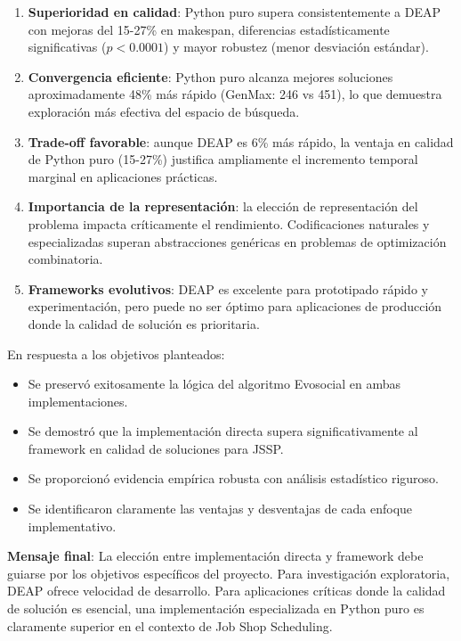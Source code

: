 \documentclass[12pt,a4paper]{article}
\begin{document}
\begin{enumerate}
    \item \textbf{Superioridad en calidad}: Python puro supera consistentemente a DEAP con mejoras del 15-27\% en makespan, diferencias estadísticamente significativas ($p < 0.0001$) y mayor robustez (menor desviación estándar).
    
    \item \textbf{Convergencia eficiente}: Python puro alcanza mejores soluciones aproximadamente 48\% más rápido (GenMax: 246 vs 451), lo que demuestra exploración más efectiva del espacio de búsqueda.
    
    \item \textbf{Trade-off favorable}: aunque DEAP es 6\% más rápido, la ventaja en calidad de Python puro (15-27\%) justifica ampliamente el incremento temporal marginal en aplicaciones prácticas.
    
    \item \textbf{Importancia de la representación}: la elección de representación del problema impacta críticamente el rendimiento. Codificaciones naturales y especializadas superan abstracciones genéricas en problemas de optimización combinatoria.
    
    \item \textbf{Frameworks evolutivos}: DEAP es excelente para prototipado rápido y experimentación, pero puede no ser óptimo para aplicaciones de producción donde la calidad de solución es prioritaria.
\end{enumerate}

En respuesta a los objetivos planteados:

\begin{itemize}
    \item Se preservó exitosamente la lógica del algoritmo Evosocial en ambas implementaciones.
    \item Se demostró que la implementación directa supera significativamente al framework en calidad de soluciones para JSSP.
    \item Se proporcionó evidencia empírica robusta con análisis estadístico riguroso.
    \item Se identificaron claramente las ventajas y desventajas de cada enfoque implementativo.
\end{itemize}

\textbf{Mensaje final}: La elección entre implementación directa y framework debe guiarse por los objetivos específicos del proyecto. Para investigación exploratoria, DEAP ofrece velocidad de desarrollo. Para aplicaciones críticas donde la calidad de solución es esencial, una implementación especializada en Python puro es claramente superior en el contexto de Job Shop Scheduling.
\end{document}
